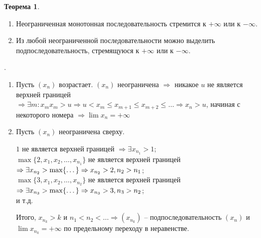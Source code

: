 \documentclass[12pt,letterpaper]{report}
\makeatletter
\newtheorem*{theorem-non}{Теорема}
\theoremstyle{definition}
\renewenvironment{proof}[1][\proofname]{%
   \par\pushQED{\qed}\normalfont%
   \topsep6\p@\@plus6\p@\relax
   \trivlist\item[\hskip\labelsep\bfseries#1\@addpunct{.}]%
   \ignorespaces
}{%
   \popQED\endtrivlist\@endpefalse
}
\makeatother
\begin{document}
    \begin{theorem-non}\end{theorem-non}
    \begin{enumerate}
        \item Неограниченная монотонная последовательность стремится
        к $+\infty$ или к $-\infty$.
        \item Из любой неограниченной последовательности можно выделить
        подпоследовательность, стремящуюся к $+\infty$ или к $-\infty$.
    \end{enumerate}
    \begin{proof}.
    \begin{enumerate}
        \item Пусть $(x_n)$ возрастает. $(x_n)$ неограничена $\Rightarrow$
        никакое $u$ не является верхней границей $\Rightarrow \exists m : x_m
        x_m > u \Rightarrow u < x_m \leq x_{m + 1} \leq x_{m + 2} \leq \dots
        \Rightarrow x_n > u$, начиная с некоторого номера $\Rightarrow
        \lim x_n = +\infty$
    
        \item Пусть $(x_n)$ неограничена сверху.
        
        $1$ не является верхней границей $\Rightarrow \exists x_{n_1} > 1$;\\
        $\max\{2, x_1, x_2, \dots, x_{n_1}\}$ не является верхней границей
        $\Rightarrow \exists x_{n_2} > \max\{\dots\} \Rightarrow x_{n_2} > 2,\\
        n_2 > n_1$;\\
        $\max\{3, x_1, x_2, \dots, x_{n_2}\}$ не является верхней границей
        $\Rightarrow \exists x_{n_3} > \max\{\dots\} \Rightarrow x_{n_3} > 3,\\
        n_3 > n_2$;\\
        и т.д.
    
        Итого, $x_{n_k} > k$ и $n_1 < n_2 < \dots \Rightarrow (x_{n_k})$
        -- подпоследовательность $(x_n)$ и $\lim x_{n_k} = +\infty$ по
        предельному переходу в неравенстве.
    \end{enumerate}
    \end{proof}
    
\end{document}
